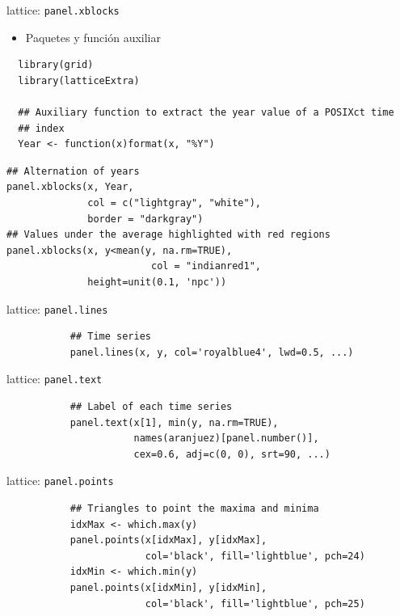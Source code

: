 \documentclass[xcolor={usenames,svgnames,dvipsnames}]{beamer}
\begin{document}
\begin{frame}[fragile,label=sec-2-3-2]{lattice: \texttt{panel.xblocks}}
 \begin{itemize}
\item Paquetes y función auxiliar
\end{itemize}
\lstset{language=R,label= ,caption= ,numbers=none}
\begin{lstlisting}
  library(grid)
  library(latticeExtra)

  ## Auxiliary function to extract the year value of a POSIXct time
  ## index
  Year <- function(x)format(x, "%Y")
\end{lstlisting}

\lstset{language=R,label= ,caption= ,numbers=none}
\begin{lstlisting}
## Alternation of years
panel.xblocks(x, Year,
              col = c("lightgray", "white"),
              border = "darkgray")
## Values under the average highlighted with red regions
panel.xblocks(x, y<mean(y, na.rm=TRUE),
                         col = "indianred1",
              height=unit(0.1, 'npc'))
\end{lstlisting}
\end{frame}
\begin{frame}[fragile,label=sec-2-3-3]{lattice: \texttt{panel.lines}}
 \lstset{language=R,label= ,caption= ,numbers=none}
\begin{lstlisting}
           ## Time series
           panel.lines(x, y, col='royalblue4', lwd=0.5, ...)
\end{lstlisting}
\end{frame}

\begin{frame}[fragile,label=sec-2-3-4]{lattice: \texttt{panel.text}}
 \lstset{language=R,label= ,caption= ,numbers=none}
\begin{lstlisting}
           ## Label of each time series
           panel.text(x[1], min(y, na.rm=TRUE),
                      names(aranjuez)[panel.number()],
                      cex=0.6, adj=c(0, 0), srt=90, ...)
\end{lstlisting}
\end{frame}


\begin{frame}[fragile,label=sec-2-3-5]{lattice: \texttt{panel.points}}
 \lstset{language=R,label= ,caption= ,numbers=none}
\begin{lstlisting}
           ## Triangles to point the maxima and minima 
           idxMax <- which.max(y)
           panel.points(x[idxMax], y[idxMax],
                        col='black', fill='lightblue', pch=24)
           idxMin <- which.min(y)
           panel.points(x[idxMin], y[idxMin],
                        col='black', fill='lightblue', pch=25)
\end{lstlisting}
\end{frame}
\end{document}
